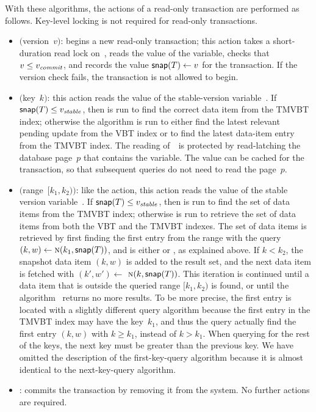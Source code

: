 With these algorithms, the actions of a read-only transaction are performed
as follows.
Key-level locking is not required for read-only transactions.
\begin{itemize}
  \setlength{\itemsep}{0pt}
  
  \item {}$($version~$v)$: begins a new read-only
  transaction; this action takes a short-duration read lock on~\comver, 
  reads the value of the variable, checks that $v \leq \smash{v_{\text{\textit{commit}}}}$, and records
  the value $\text{\textsf{snap}}(T) \gets v$ for the transaction.
  If the version check fails, the transaction is not allowed to begin.

  \item {}$($key~$k)$:
  this action reads the value of the stable-version variable~\stablever.
  If $\text{\textsf{snap}}(T) \leq \smash{v_{\text{\textit{stable}}}}$, then  is run to find
  the correct data item from the TMVBT index; 
  otherwise the  algorithm is run to 
  either find the latest relevant pending update from the VBT index or to
  find the latest data-item entry from the TMVBT index.
  The reading of~\stablever\ is protected by read-latching the database
  page~$p$ that contains the variable.
  The value can be cached for the transaction, so that subsequent
  queries do not need to read the page~$p$. 

  \item {}$($range~$[k_1, k_2))$:
  like the  action, this action reads the value of the
  stable version variable~\stablever.
  If $\text{\textsf{snap}}(T) \leq \smash{v_{\text{\textit{stable}}}}$, then  is run to find
  the set of data items from the TMVBT index; 
  otherwise  is run to retrieve the set of data
  items from both the VBT and the TMVBT indexes.
  The set of data items is retrieved by first finding the first entry from the
  range with the query $(k, w) \gets \proc{N}(k_1, \snapver{T})$, and
   is either  or , as
  explained above.
  If $k < k_2$, the snapshot data item $(k, w)$ is added to the result
  set, and the next data item is fetched with $(k', w')
  \gets$ $\proc{N}(k, \snapver{T})$.
  This iteration is continued until a data item that is outside the
  queried range $[k_1, k_2)$ is found, or until the algorithm~
  returns no more results.
  To be more precise, the first entry is located with a slightly different
  query algorithm because the first entry in the TMVBT index may have the
  key~$k_1$, and thus the query actually find the first entry $(k,w)$ with $k
  \geq k_1$, instead of $k > k_1$.
  When querying for the rest of the keys, the next key must be greater than
  the previous key.
  We have omitted the description of the first-key-query algorithm because it
  is almost identical to the next-key-query algorithm. 

  \item {}: commits the transaction by removing
  it from the system. 
  No further actions are required.
\end{itemize}

